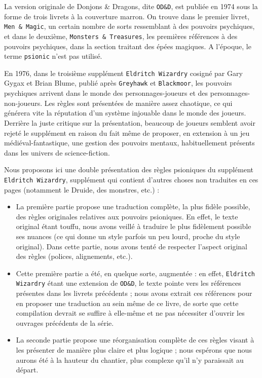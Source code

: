 \documentclass[11pt]{article}
\begin{document}
La version originale de Donjons \& Dragons, dite \texttt{OD\&D}, est publiée en 1974 sous la forme de trois livrets à la couverture marron. On trouve dans le premier livret, \texttt{Men \& Magic}, un certain nombre de sorts ressemblant à des pouvoirs psychiques, et dans le deuxième, \texttt{Monsters \& Treasures}, les premières références à des pouvoirs psychiques, dans la section traitant des épées magiques. A l'époque, le terme \texttt{psionic} n'est pas utilisé.

En 1976, dans le troisième supplément \texttt{Eldritch Wizardry} cosigné par Gary Gygax et Brian Blume, publié après \texttt{Greyhawk} et \texttt{Blackmoor}, les pouvoirs psychiques arrivent dans le monde des personnages-joueurs et des personnages-non-joueurs. Les règles sont présentées de manière assez chaotique, ce qui générera vite la réputation d'un système injouable dans le monde des joueurs. Derrière la juste critique sur la présentation, beaucoup de joueurs semblent avoir rejeté le supplément en raison du fait même de proposer, en extension à un jeu médiéval-fantastique, une gestion des pouvoirs mentaux, habituellement présents dans les univers de science-fiction.

Nous proposons ici une double présentation des règles psioniques du supplément \texttt{Eldritch Wizardry}, supplément qui contient d'autres choses non traduites en ces pages (notamment le Druide, des monstres, etc.) :

\begin{itemize}
\item La première partie propose une traduction complète, la plus fidèle possible, des règles originales relatives aux pouvoirs psioniques. En effet, le texte original étant touffu, nous avons veillé à traduire le plus fidèlement possible ses nuances (ce qui donne un style parfois un peu lourd, proche du style original). Dans cette partie, nous avons tenté de respecter l'aspect original des règles (polices, alignements, etc.).
\item Cette première partie a été, en quelque sorte, \og augmentée \fg{} : en effet, \texttt{Eldritch Wizardry} étant une extension de \texttt{OD\&D}, le texte pointe vers les références présentes dans les livrets précédents ; nous avons extrait ces références pour en proposer une traduction au sein même de ce livre, de sorte que cette compilation devrait se suffire à elle-même et ne pas nécessiter d'ouvrir les ouvrages précédents de la série.
\item La seconde partie propose une réorganisation complète de ces règles visant à les présenter de manière plus claire et plus logique ; nous espérons que nous aurons été à la hauteur du chantier, plus complexe qu'il n'y paraissait au départ.
\end{itemize}
\end{document}
